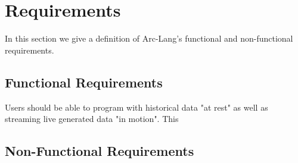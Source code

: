 \section{Requirements}

In this section we give a definition of Arc-Lang's functional and non-functional requirements. 

\subsection{Functional Requirements}

Users should be able to program with historical data "at rest" as well as streaming live generated data "in motion". This 

\subsection{Non-Functional Requirements}

